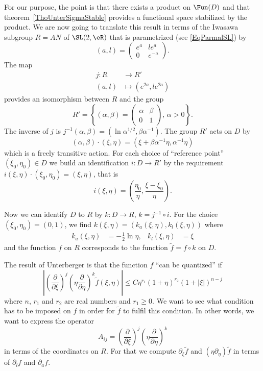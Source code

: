 For our purpose, the point is that there exists a product on $\Fun(D)$ and that theorem~\ref{ThoUnterSigmaStable} provides a functional space stabilized by the product. We are now going to translate this result in terms of the Iwasawa subgroup $R=AN$ of $\SL(2,\eR)$ that is parametrized (see \eqref{EqParmalSL}) by
\[
	(a,l)=\begin{pmatrix}
		e^{a} & l e^{a} \\0& e^{-a}
	\end{pmatrix}.
\]
The map
\begin{equation}
	\begin{aligned}
		j\colon R & \to R'                     \\
		(a,l)     & \mapsto ( e^{2a},l e^{2a})
	\end{aligned}
\end{equation}
provides an isomorphism between $R$ and the group
\[
	R'=\left\{ (\alpha,\beta)= \begin{pmatrix}
		\alpha & \beta \\0&1
	\end{pmatrix},\,\alpha>0 \right\}.
\]
The inverse of $j$ is  $j^{-1}(\alpha,\beta)=(\ln\alpha^{1/2},\beta\alpha^{-1})$.  The group $R'$ acts on $D$ by
\begin{equation}
	(\alpha,\beta)\cdot(\xi,\eta)=(\xi+\beta\alpha^{-1}\eta,\alpha^{-1}\eta)
\end{equation}
which is a freely transitive action. For each choice of ``reference point'' $(\xi_0,\eta_0)\in D$ we  build an identification $i\colon D\to R'$ by the requirement $ i(\xi,\eta)\cdot(\xi_0,\eta_0)=(\xi,\eta)$, that is
\begin{equation}
	i(\xi,\eta)=\left( \frac{ \eta_0 }{ \eta },\frac{ \xi-\xi_0 }{ \eta } \right).
\end{equation}

Now we can identify $D$ to $R$ by $k\colon D\to R$, $k=j^{-1}\circ i$. For the choice $(\xi_0,\eta_0)=(0,1)$, we find $k(\xi,\eta)=(k_a(\xi,\eta),k_l(\xi,\eta))$ where
\begin{align}\label{Eqkaklexp}
	k_a(\xi,\eta) & =-\frac{ 1 }{2}\ln\eta,
	              & k_l(\xi,\eta)           & =\xi
\end{align}
and the function $f$ on $R$ corresponds to the function $\tilde f=f\circ k$ on $D$.

The result of Unterberger is that the function $f$ ``can be quantized'' if
\begin{equation}  \label{eq_condeUnterD}
	\left|  \left( \frac{ \partial }{ \partial\xi } \right)^j\left( \eta\frac{ \partial }{ \partial\eta } \right)^k  \tilde f(\xi,\eta)  \right|
	\leq C\eta^{r_1}(1+\eta)^{r_2}(1+| \xi |)^{n-j}
\end{equation}
where $n$, $r_1$ and $r_2$ are real numbers and $r_1\geq0$. We want to see what condition has to be imposed on $f$  in order for $\tilde f$ to fulfil this condition. In other words, we want to express the operator
\[
	A_{ij}=\left( \frac{ \partial }{ \partial\xi } \right)^j\left( \eta\frac{ \partial }{ \partial\eta } \right)^k
\]
in terms of the coordinates on $R$. For that we compute $\partial_{\xi}\tilde f$ and $(\eta\partial_{\eta})\tilde f$ in terms of $\partial_lf$ and $\partial_af$.


